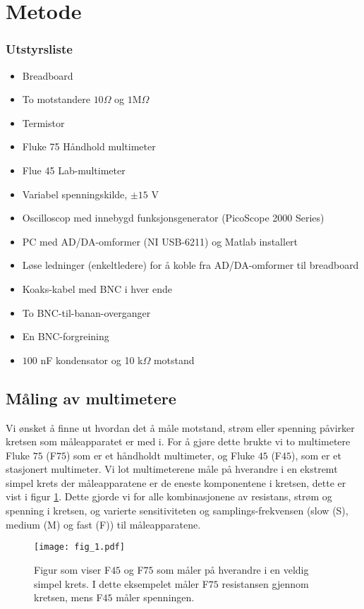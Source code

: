 \documentclass[%
 reprint,
 amsmath,amssymb,
 aps,
]{revtex4-1}
\begin{document}
\section{\label{metode1}Metode}
\subsubsection*{Utstyrsliste}
\begin{itemize}
\item Breadboard
\item To motstandere $10\Omega$ og $1$M$\Omega$
\item Termistor
\item Fluke 75 Håndhold multimeter
\item Flue 45 Lab-multimeter
\item Variabel spenningskilde, $\pm 15$ V
\item Oscilloscop med innebygd funksjonsgenerator (PicoScope 2000 Series)
\item PC med AD/DA-omformer (NI USB-6211) og Matlab installert
\item Løse ledninger (enkeltledere) for å koble fra AD/DA-omformer til breadboard
\item Koaks-kabel med BNC i hver ende
\item To BNC-til-banan-overganger
\item En BNC-forgreining
\item $100$ nF kondensator og 10 k$\Omega$ motstand
\end{itemize}
\subsection{Måling av multimetere}
Vi ønsket å finne ut hvordan det å måle motstand, strøm eller spenning påvirker kretsen som måleapparatet er med i. For å gjøre dette brukte vi to multimetere Fluke $75$ (F$75$) som er et håndholdt multimeter, og Fluke $45$ (F$45$), som er et stasjonert multimeter. Vi lot multimeterene måle på hverandre i en ekstremt simpel krets der måleapparatene er de eneste komponentene i kretsen, dette er vist i figur \ref{fig1}. Dette gjorde vi for alle kombinasjonene av resistans, strøm og spenning i kretsen, og varierte sensitiviteten og samplings-frekvensen (slow (S), medium (M) og fast (F)) til måleapparatene. \\
\begin{figure}[h!]
    \centering
    \texttt{[image: fig\_1.pdf]}
    \caption{Figur som viser F$45$ og F$75$ som måler på hverandre i en veldig simpel krets. I dette eksempelet måler F$75$ resistansen gjennom kretsen, mens F$45$ måler spenningen.}
    \label{fig1}
\end{figure}
\end{document}
